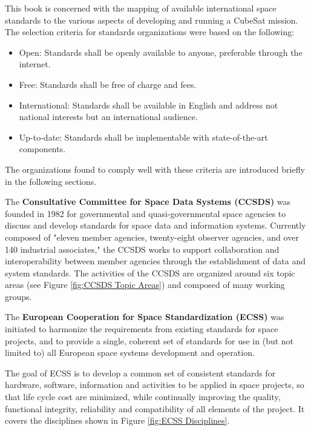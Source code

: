 This book is concerned with the mapping of available international space standards to the various aspects of developing and running a CubeSat mission. The selection criteria for standards organizations were based on the following:

\begin{itemize}
\item Open: Standards shall be openly available to anyone, preferable through the internet.
\item Free: Standards shall be free of charge and fees.
\item International: Standards shall be available in English and address not national interests but an international audience.
\item Up-to-date: Standards shall be implementable with state-of-the-art components.
\end{itemize}

The organizations found to comply well with these criteria are introduced briefly in the following sections.

The \textbf{Consultative Committee for Space Data Systems (CCSDS)} \cite{ccsds.org} was founded in 1982 for governmental and quasi-governmental space agencies to discuss and develop standards for space data and information systems. Currently composed of "eleven member agencies, twenty-eight observer agencies, and over 140 industrial associates," the CCSDS works to support collaboration and interoperability between member agencies through the establishment of data and system standards. The activities of the CCSDS are organized around six topic areas (see Figure \ref{fig:CCSDS Topic Areas}) and composed of many working groups.

The \textbf{European Cooperation for Space Standardization (ECSS)} \cite{ecss.nl} was initiated to harmonize the requirements from existing standards for space projects, and to provide a single, coherent set of standards for use in (but not limited to) all European space systems development and operation.

The goal of ECSS is to develop a common set of consistent standards for hardware, software, information and activities to be applied in space projects, so that life cycle cost are minimized, while continually improving the quality, functional integrity, reliability and compatibility of all elements of the project. It covers the disciplines shown in Figure \ref{fig:ECSS Disciplines}. 

